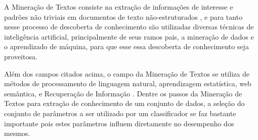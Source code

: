 
A Mineração de Textos consiste na extração de informações de interesse e padrões não triviais em documentos de texto não-estruturados \cite{Srivastava2009TMCCA}, e para tanto nesse processo de descoberta de conhecimento são utilizadas diversas técnicas de inteligência artificial, principalmente de seus ramos pais, a mineração de dados e o aprendizado de máquina, para que esse essa descoberta de conhecimento seja proveitosa.

Além dos campos citados acima, o campo da Mineração de Textos se utiliza de métodos de processamento de linguagem natural, aprendizagem estatística, web semântica, e Recuperação de Informação \cite{Sammut2017EMLDM} \cite{Manning2008IIR}. 
Dentre os passos da Mineração de Textos para extração de conhecimento de um conjunto de dados, a seleção do conjunto de parâmetros a ser utilizado por um classificador se faz bastante importante pois estes parâmetros influem diretamente no desempenho dos mesmos.
